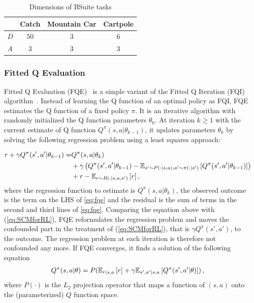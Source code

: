 \begin{table}
    \centering
    \begin{tabular}{lccc}
         &  \textbf{Catch} &\textbf{Mountain Car} & \textbf{Cartpole} \\ \hline
        $D$ & 50 & 3 & 6\\
        $A$ & 3 & 3 & 3
    \end{tabular}
    \caption{Dimensions of BSuite tasks}
    \label{tab:bsuite_dims}
\end{table}

\subsubsection{Fitted Q Evaluation}
\label{sec:app_fqe}
Fitted Q Evaluation (FQE)~\citep{le2019batch} is a simple variant of the Fitted Q Iteration (FQI) algorithm~\citep{ernst2005tree}. Instead of learning the Q function of an optimal policy as FQI, FQE estimates the Q function of a fixed policy $\pi$. It is an iterative algorithm with randomly initialized the Q function parameters $\theta_0$. At iteration $k\geq 1$ with the current estimate of Q function $Q^{\pi}(s, a|\theta_{k-1})$, it updates parameters $\theta_k$ by solving the following regression problem using a least squares approach:

\begin{align}\label{eq:fqe}
    r + \gamma Q^{\pi}(s',a'|\theta_{k-1}) =& Q^{\pi}(s,a|\theta_{k}) \\
       &+ \gamma \left(Q^{\pi}(s',a'|\theta_{k-1})- \expect[s'\sim P(\cdot|s,a), a'\sim \pi(\cdot | s')]{Q^{\pi}(s',a'|\theta_{k-1})}\right) \nonumber \\
       &+r-\expect[r\sim R(\cdot | s, a,s')]{r} \nonumber,
\end{align}
where the regression function to estimate is $Q^{\pi}(s,a|\theta_{k})$, the observed outcome is the term on the LHS of \eqref{eq:fqe} and the residual is the sum of terms in the second and third lines of  \eqref{eq:fqe}. Comparing the equation above with (\ref{eq:SCMforRL}), FQE reformulates the regression problem and moves the confounded part in the treatment of (\ref{eq:SCMforRL}), that is $\gamma Q^\pi(s', a')$, to the outcome. The regression problem at each iteration is therefore not confounded any more. If FQE converges, it finds a solution of the following equation
\begin{align}
    Q^{\pi}(s,a|\theta) = P(\expect[r|s,a]{r} + \gamma \expect[s', a'|s,a]{Q^{\pi}(s',a'|\theta)})\,,
\end{align}
where $P(\cdot)$ is the $L_2$ projection operator that maps a function of $(s, a)$ onto the (parameterized) $Q$ function space.